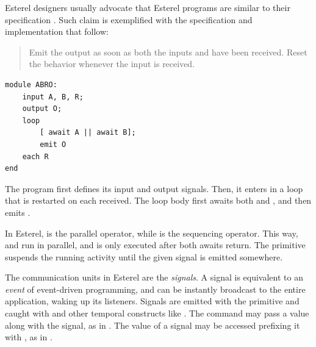 

Esterel designers usually advocate that Esterel programs are similar to their 
specification \cite{esterel.foundations,esterel.ieee91}.
Such claim is exemplified with the specification and implementation that 
follow:

\begin{quote}
Emit the output  as soon as both the inputs  and  have 
been received.
Reset the behavior whenever the input  is received.
\end{quote}


\begin{lstlisting}
module ABRO:
    input A, B, R;
    output O;
    loop
        [ await A || await B];
        emit O
    each R
end
\end{lstlisting}

The program first defines its input and output signals.
Then, it enters in a loop that is restarted on each  received.
The loop body first awaits both  and , and then emits .

In Esterel, \code{||} is the parallel operator, while \code{;} is the 
sequencing operator.
This way,  and  run in parallel, and  
is only executed after both awaits return.
The  primitive suspends the running activity until the given signal 
is emitted somewhere.

The communication units in Esterel are the \emph{signals}.
A signal is equivalent to an \emph{event} of event-driven programming, and can 
be instantly broadcast to the entire application, waking up its listeners.
Signals are emitted with the  primitive and caught with  
and other temporal constructs like .
The  command may pass a value along with the signal, as in 
.
The value of a signal may be accessed prefixing it with , as in 
.

